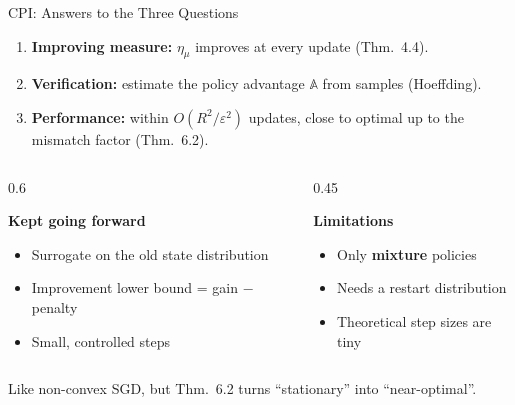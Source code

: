 \documentclass[aspectratio=169]{beamer}
\newcommand{\PA}{\mathbb{A}}              %
\begin{document}
\begin{frame}[label=cpi-summary]{CPI: Answers to the Three Questions}
  \begin{enumerate}
    \item \textbf{Improving measure:} $\eta_\mu$ improves at every update (Thm.~4.4).
    \item \textbf{Verification:} estimate the policy advantage $\PA$ from samples (Hoeffding).
    \item \textbf{Performance:} within $O(R^2/\varepsilon^2)$ updates, close to optimal up to the mismatch factor (Thm.~6.2).
  \end{enumerate}

  \vspace{8pt}
  \begin{columns}[t]
    \begin{column}{0.6\textwidth}
      \begin{goodbox}
        \small\textbf{Kept going forward}
        \begin{itemize}
          \item Surrogate on the old state distribution
          \item Improvement lower bound = gain $-$ penalty
          \item Small, controlled steps
        \end{itemize}
      \end{goodbox}
    \end{column}
    \begin{column}{0.45\textwidth}
      \begin{badbox}
        \small\textbf{Limitations}
        \begin{itemize}
          \item Only \textbf{mixture} policies
          \item Needs a restart distribution
          \item Theoretical step sizes are tiny
        \end{itemize}
      \end{badbox}
    \end{column}
  \end{columns}

  \vspace{6pt}
  {\small Like non-convex SGD, but Thm.~6.2 turns ``stationary'' into ``near-optimal''.} \hfill \hyperlink{cpi-sgd}{}
\end{frame}
\end{document}
